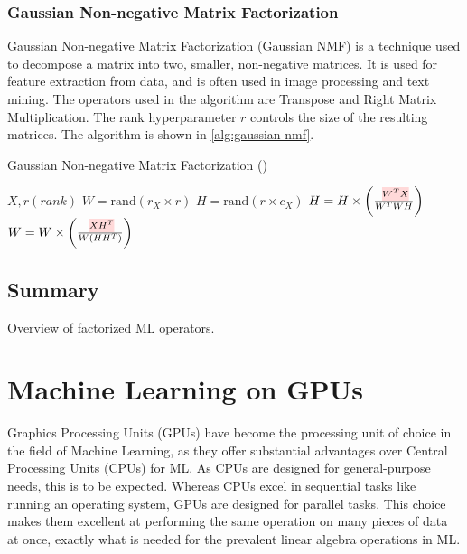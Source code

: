 \subsubsection{Gaussian Non-negative Matrix Factorization}
Gaussian Non-negative Matrix Factorization (Gaussian NMF) is a technique used to decompose a matrix into two, smaller, non-negative matrices. It is used for feature extraction from data, and is often used in image processing and text mining. The operators used in the algorithm are Transpose and Right Matrix Multiplication. The rank hyperparameter $r$ controls the size of the resulting matrices. The algorithm is shown in \autoref{alg:gaussian-nmf}.

\begin{algorithm}[ht]
    \caption[Gaussian NMF]{Gaussian Non-negative Matrix Factorization
        (\cite{morpheus})}\label{alg:gaussian-nmf}
    \begin{algorithmic}
        \Require $X, r (rank)$
        \State $W = \text{rand}(r_X \times r)$ 
        \State $H = \text{rand}(r \times c_X)$ 
        \State $H = H \times \left(\frac{\text{\red{$W^T X$}}}{W^T W H}\right)$
        \State $W = W \times \left(\frac{\text{\red{$X H^T$}}}{W(H H^T)}\right)$
        \EndFor
    \end{algorithmic}
\end{algorithm}


\subsection{Summary}
\label{subsec:factorized-ml-summary}

\begin{table}[h]
    \small
    \resizebox{\textwidth}{!}{%
        }
    \caption{Overview of factorized ML operators.}
    \label{tab:factorized-ml-operators-overview}
\end{table}

\section{Machine Learning on GPUs}
\label{sec:2-ml-on-gpu}
Graphics Processing Units (GPUs) have become the processing unit of choice in the field of Machine Learning, as they offer substantial advantages over Central Processing Units (CPUs) for ML. As CPUs are designed for general-purpose needs, this is to be expected. Whereas CPUs excel in sequential tasks like running an operating system, GPUs are designed for parallel tasks. This choice makes them excellent at performing the same operation on many pieces of data at once, exactly what is needed for the prevalent linear algebra operations in ML.

